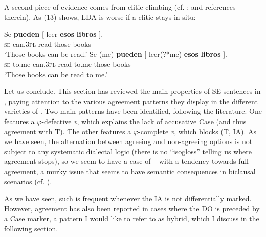 \documentclass[output=paper]{langsci/langscibook}
\begin{document}
\ea%
    \label{ex:gallego:12}
    \z
\z

A second piece of evidence comes from clitic climbing (cf. \citealt{Gallego2016,Paradís2016}; and references therein). As (13) shows, LDA is worse if a clitic stays in situ:

\ea%
    \label{ex:gallego:13}
    \ea
    \gll Se  \textbf{pueden}  [ leer   \textbf{esos}    \textbf{libros} ].\\
         \textsc{se} can\textsc{{}.3pl} {}  read  those  books\\
    \glt ‘Those books can be read.’
    \ex
    \gll Se   (me)      \textbf{pueden}  [ leer(?*me)    \textbf{esos}    \textbf{libros} ].\\
         \textsc{se} to.me  can\textsc{{}.3pl} {}   {read   to.me}  those  books\\
    \glt ‘Those books can be read to me.’
    \z
\z

Let us conclude. This section has reviewed the main properties of SE sentences in , paying attention to the various agreement patterns they display in the different varieties of . Two main patterns have been identified, following the literature. One features a $\varphi $-defective \textit{v}, which explains the lack of accusative Case (and thus agreement with T). The other features a $\varphi $-complete \textit{v}, which blocks  (T, IA). As we have seen, the alternation between agreeing and non-agreeing options is not subject to any systematic dialectal logic (there is no “isogloss” telling us where agreement stops), so we seem to have a case of  – with a tendency towards full agreement, a murky issue that seems to have semantic consequences in biclausal scenarios (cf. \citealt{Martin1998,Fernández-Serrano2016}). 

As we have seen, such  is frequent whenever the IA is not differentially marked. However, agreement has also been reported in cases where the DO is preceded by a Case marker, a pattern I would like to refer to as hybrid, which I discuss in the following section.
\end{document}
